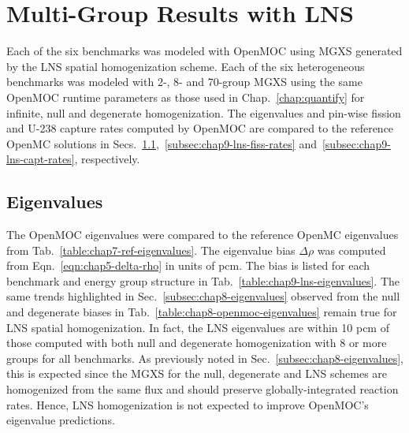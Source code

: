 \section{Multi-Group Results with LNS}
\label{sec:chap9-lns-results}

Each of the six benchmarks was modeled with OpenMOC using \ac{MGXS} generated by the \ac{LNS} spatial homogenization scheme. Each of the six heterogeneous benchmarks was modeled with 2-, 8- and 70-group \ac{MGXS} using the same OpenMOC runtime parameters as those used in Chap.~\ref{chap:quantify} for infinite, null and degenerate homogenization. The eigenvalues and pin-wise fission and U-238 capture rates computed by OpenMOC are compared to the reference OpenMC solutions in Secs.~\ref{subsec:chap9-lns-eigenvalues},~\ref{subsec:chap9-lns-fiss-rates} and~\ref{subsec:chap9-lns-capt-rates}, respectively.

\subsection{Eigenvalues}
\label{subsec:chap9-lns-eigenvalues}

The OpenMOC eigenvalues were compared to the reference OpenMC eigenvalues from Tab.~\ref{table:chap7-ref-eigenvalues}. The eigenvalue bias $\Delta\rho$ was computed from Eqn.~\ref{eqn:chap5-delta-rho} in units of \ac{pcm}. The bias is listed for each benchmark and energy group structure in Tab.~\ref{table:chap9-lns-eigenvalues}. The same trends highlighted in Sec.~\ref{subsec:chap8-eigenvalues} observed from the null and degenerate biases in Tab.~\ref{table:chap8-openmoc-eigenvalues} remain true for \ac{LNS} spatial homogenization. In fact, the \ac{LNS} eigenvalues are within 10 \ac{pcm} of those computed with both null and degenerate homogenization with 8 or more groups for all benchmarks. As previously noted in Sec.~\ref{subsec:chap8-eigenvalues}, this is expected since the \ac{MGXS} for the null, degenerate and \ac{LNS} schemes are homogenized from the same flux and should preserve globally-integrated reaction rates. Hence, \ac{LNS} homogenization is not expected to improve OpenMOC's eigenvalue predictions.

